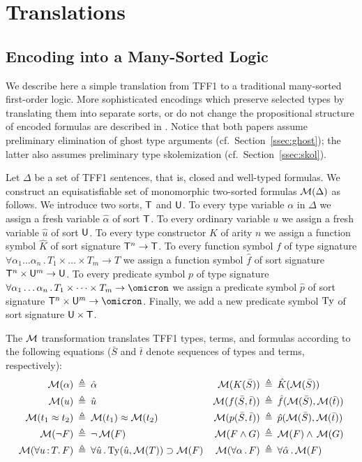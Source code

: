 \section{Translations} \label{sec:trans}

\subsection{Encoding into a Many-Sorted Logic} \label{ssec:tff0}

We describe here a simple translation from TFF1 to a traditional
many-sorted first-order logic. More sophisticated encodings which
preserve selected types by translating them into separate sorts,
or do not change the propositional structure of encoded formulas
are described in \cite{leino10tacas,bobot11frocos}.
Notice that both papers assume preliminary elimination
of ghost type arguments (cf.~Section~\ref{ssec:ghost});
the latter also assumes preliminary type skolemization
(cf.~Section~\ref{ssec:skol}).

Let $\Delta$ be a set of TFF1 sentences, that is, closed and well-typed
formulas. We construct an equisatisfiable set of monomorphic two-sorted
formulas $\mathcal{M}(\Delta)$ as follows.
%
We introduce two sorts, $\mathsf{T}$ and $\mathsf{U}$.
To every type variable $\alpha$ in $\Delta$ we assign
a fresh variable $\hat{\alpha}$ of sort $\mathsf{T}$.
To every ordinary variable $u$ we assign
a fresh variable $\hat{u}$ of sort $\mathsf{U}$.
To every type constructor $K$ of arity $n$ we assign
a function symbol $\hat{K}$ of sort signature $\mathsf{T}^n \to \mathsf{T}$.
To every function symbol $f$ of type signature
$\forall \alpha_1\dots\alpha_n \,.\, T_1 \times \dots \times T_m \to T$
we assign a function symbol $\hat{f}$ of sort signature
$\mathsf{T}^n \times \mathsf{U}^m \to \mathsf{U}$.
To every predicate symbol $p$ of type signature
$\forall \alpha_1\dots\alpha_n \,.\, T_1 \times \dots \times T_m \to \omicron$
we assign a predicate symbol $\hat{p}$ of sort signature
$\typ^n \times \und^m \to \omicron$.
Finally, we add a new predicate symbol $\mathrm{Ty}$ of sort signature
$\mathsf{U} \times \mathsf{T}$.

The $\mathcal{M}$ transformation translates TFF1 types, terms, and formulas
according to the following equations ($\bar{S}$ and $\bar{t}$ denote
sequences of types and terms, respectively):
\begin{align*}
\mathcal{M}(\alpha) &\:\triangleq\: \hat{\alpha} &
\mathcal{M}(K(\bar{S})) &\:\triangleq\: \hat{K}(\mathcal{M}(\bar{S})) \\
\mathcal{M}(u) &\:\triangleq\: \hat{u} &
\mathcal{M}(f(\bar{S},\bar{t})) &\:\triangleq\: \hat{f}(\mathcal{M}(\bar{S}),\mathcal{M}(\bar{t})) \\
\mathcal{M}(t_1 \approx t_2) &\:\triangleq\: \mathcal{M}(t_1) \approx \mathcal{M}(t_2) &
\mathcal{M}(p(\bar{S},\bar{t})) &\:\triangleq\: \hat{p}(\mathcal{M}(\bar{S}),\mathcal{M}(\bar{t})) \\
\mathcal{M}(\lnot F) &\:\triangleq\: \lnot\, \mathcal{M}(F) &
\mathcal{M}(F \land G) &\:\triangleq\: \mathcal{M}(F) \land\, \mathcal{M}(G) \\
\mathcal{M}(\forall u \operatorname{:} T .\, F) &\:\triangleq\:
\forall \hat{u} \,.\, \mathrm{Ty}(\hat{u}, \mathcal{M}(T)) \supset \mathcal{M}(F) &
\mathcal{M}(\forall \alpha \,.\, F) &\:\triangleq\:
\forall \hat{\alpha} \,.\, \mathcal{M}(F)
\end{align*}

